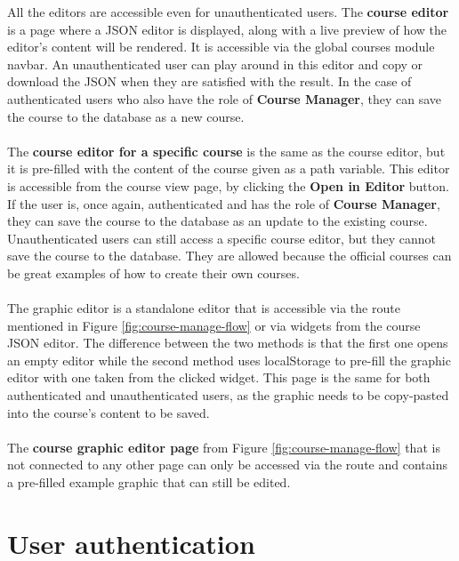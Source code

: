 \newpage
\noindent All the editors are accessible even for unauthenticated users. The \textbf{course editor} is a page where a JSON editor is displayed, along with a live preview of how the editor's content will be rendered. It is accessible via the global courses module navbar. An unauthenticated user can play around in this editor and copy or download the JSON when they are satisfied with the result. In the case of authenticated users who also have the role of \textbf{Course Manager}, they can save the course to the database as a new course.
\\\\
\noindent The \textbf{course editor for a specific course} is the same as the course editor, but it is pre-filled with the content of the course given as a path variable. This editor is accessible from the course view page, by clicking the \textbf{Open in Editor} button. If the user is, once again, authenticated and has the role of \textbf{Course Manager}, they can save the course to the database as an update to the existing course. Unauthenticated users can still access a specific course editor, but they cannot save the course to the database. They are allowed because the official courses can be great examples of how to create their own courses.
\\\\
\noindent The graphic editor is a standalone editor that is accessible via the route mentioned in Figure \ref{fig:course-manage-flow} or via widgets from the course JSON editor. The difference between the two methods is that the first one opens an empty editor while the second method uses localStorage to pre-fill the graphic editor with one taken from the clicked widget. This page is the same for both authenticated and unauthenticated users, as the graphic needs to be copy-pasted into the course's content to be saved.
\\\\
\noindent The \textbf{course graphic editor page} from Figure \ref{fig:course-manage-flow} that is not connected to any other page can only be accessed via the route and contains a pre-filled example graphic that can still be edited.

\section{User authentication}

